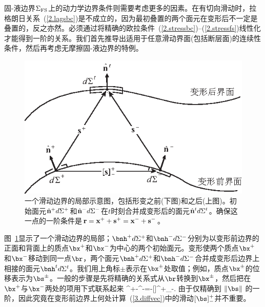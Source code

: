 固-液边界$\Sigma_{\rm FS}$上的动力学边界条件则需要考虑更多的因素。在有切向滑动时，拉格朗日关系~(\ref{2.lagsbc})是不成立的，因为最初叠置的两个面元在变形后不一定是叠置的，反之亦然。必须通过将精确的欧拉条件~(\ref{2.stressbc})--(\ref{2.stressfs})线性化才能得到一阶的关系。我们首先推导出适用于任意滑动界面(包括断层面)的连续性条件，然后再考虑无摩擦固-液边界的特例。
\begin{figure}[!b]
\begin{center}
\includegraphics{../figures/chap03/fig03.eps}
\end{center}
\caption[slipbc]{\label{fig3.3}
一个滑动边界的局部示意图，包括形变之前(下图)和之后(上图)。初始面元$\hat{\bf n}^+d\/\Sigma^+$和$\hat{\bf n}^-d\/\Sigma^-$在$t$时刻合并成变形后的面元$\hat{\bf n}^td\/\Sigma^t$。确保这一点的一阶条件是${\bf r}={\bf x}^++{\bf s}^+={\bf x}^-+{\bf s}^-$。
}
\end{figure}
图~\ref{fig3.3}显示了一个滑动边界的局部；$\bnh^+d\/\Sigma^+$和$\bnh^-d\/\Sigma^-$分别为以变形前边界的正面和背面上的质点$\bx^+$和$\bx^-$为中心的两个初始面元。变形使两个质点$\bx^+$和$\bx^-$移动到同一点$\br$，两个面元$\bnh^+d\/\Sigma^+$和$\bnh^-d\/\Sigma^-$合并成变形后边界上相接的面元$\bnh^td\/\Sigma^t$。我们用上角标$\pm$表示在$\bx^{\pm}$处取值；例如，质点$\bx^{\pm}$的位移表示为$\bs^{\pm}$。一般的步骤是先将精确的关系式从$\br$转换到$\bx^{\pm}$，然后把在$\bx^+$与$\bx^-$两处的项用下式联系起来
\eq
\label{3.diffvec}
\bx^+-\bx^-=-[\bs]^+_-.
\en
由于仅精确到 $\|\bs\|$ 的一阶，因此究竟在变形前边界上何处计算~(\ref{3.diffvec})中的滑动$[\bs]^+_-$并不重要。

